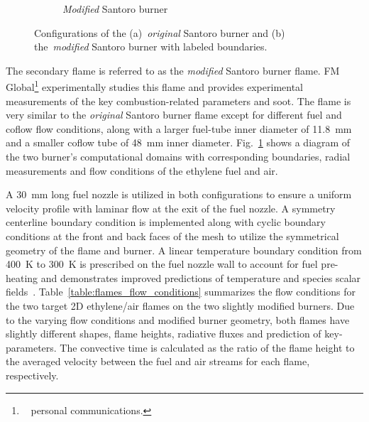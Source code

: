 \documentclass[12pt]{CHT-20}
\begin{document}
\begin{figure}[H]
\begin{subfigure}[b]{0.48\textwidth}
         \caption{\emph{Modified} Santoro burner}
     \end{subfigure}
        \caption{Configurations of the (a)~\emph{original} Santoro burner and (b) the~\emph{modified} Santoro burner with labeled boundaries.}
        \label{fig:meshes}
\end{figure}

The secondary flame is referred to as the \emph{modified} Santoro burner flame. FM Global\footnote{~\citet{fmGlobal} personal communications.} experimentally studies this flame and provides experimental measurements of the key combustion-related parameters and soot. The flame is very similar to the \emph{original} Santoro burner flame except for different fuel and coflow flow conditions, along with a larger fuel-tube inner diameter of 11.8~mm and a smaller coflow tube of 48~mm inner diameter. Fig.~\ref{fig:meshes} shows a diagram of the two burner's computational domains with corresponding boundaries, radial measurements and flow conditions of the ethylene fuel and air. 

A 30~mm long fuel nozzle is utilized in both configurations to ensure a uniform velocity profile with laminar flow at the exit of the fuel nozzle. A symmetry centerline boundary condition is implemented along with cyclic boundary conditions at the front and back faces of the mesh to utilize the symmetrical geometry of the flame and burner. A linear temperature boundary condition from 400~K to 300~K is prescribed on the fuel nozzle wall to account for fuel pre-heating and demonstrates improved predictions of temperature and species scalar fields~\citep[]{Squeo2021,Dasgupta2015}. Table~\ref{table:flames_flow_conditions} summarizes the flow conditions for the two target 2D ethylene/air flames on the two slightly modified burners. Due to the varying flow conditions and modified burner geometry, both flames have slightly different shapes, flame heights, radiative fluxes and prediction of key-parameters. The convective time is calculated as the ratio of the flame height to the averaged velocity between the fuel and air streams for each flame, respectively.
\end{document}

